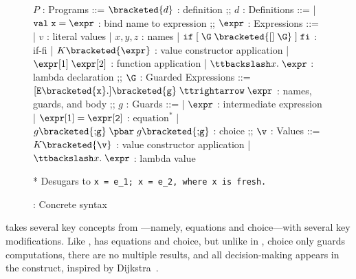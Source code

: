 \documentclass[manuscript,screen,review, 12pt, nonacm]{acmart}
\begin{document}
        \begin{figure}[H]
          \begin{center}
              \begin{bnf}
              $P$ : \textsf{Programs} ::=
              $\bracketed{d}$ : definition
              ;;
              $d$ : \textsf{Definitions} ::=
              | $\tt{val}\; x\; \tt{=}\; \expr$ : bind name to expression
              ;;
              $\expr$ : \textsf{Expressions} ::=
              | $v$ : literal values 
              | $x, y, z$ : names
              | $\tt{if}\; [\; \G\; \bracketed{\tt{[]}\; \G}\;]\; \tt{fi}$ : if-fi 
              | $K \bracketed{\expr}$ : value constructor application 
              | $\expr[1]\; \expr[2]$ : function application 
              | $\ttbackslash x\tt{.}\; \expr$ : lambda declaration 
              ;;
              $\G$ : \textsf{Guarded Expressions} ::=  
              $[\tt{E }{\bracketed{x}}{\tt{.}}] \bracketed{g} \;\ttrightarrow\; \expr$ : names, guards, and body
              ;;
              $g$ : \textsf{Guards} ::=  
              | $\expr$ : intermediate expression 
              | $\expr[1] \;\tt{=}\; \expr[2]$ : $\text{equation}^{*}$
              | $ g \bracketed{\tt{;} g} \; \pbar \; g \bracketed{\tt{;} g}$ : choice 
              ;;
              $\v$ : Values ::= $K\bracketed{\v}$ : value constructor application 
              | $\ttbackslash x\tt{.}\; \expr$ : lambda value
              \end{bnf}

              * Desugars to \tt{x = e\_{1}; x = e\_{2}}, where \tt{x} is fresh. 
          \end{center}
              \caption{\VMinus: Concrete syntax}
              \label{fig:vmsyntax}
              \end{figure}      

        \VMinus takes several key concepts from {\VC}---namely, equations and
        choice---with several key modifications. Like \VC, \VMinus has
        equations and choice, but unlike in \VC, choice only guards computations, 
        there are no multiple results, and all decision-making appears in the 
        \iffibf construct, inspired by Dijkstra~\citep{dijkstra}. 
      
\end{document}
